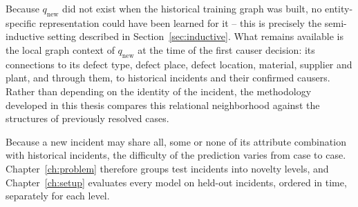 Because $q_{\text{new}}$ did not exist when the historical training graph
was built, no entity-specific representation could have been learned for
it -- this is precisely the semi-inductive setting described in
Section~\ref{sec:inductive}. What remains available is the local graph
context of $q_{\text{new}}$ at the time of the first causer decision: its
connections to its defect type, defect place, defect location, material,
supplier and plant, and through them, to historical incidents and their
confirmed causers. Rather than depending on the identity of the incident,
the methodology developed in this thesis compares this relational
neighborhood against the structures of previously resolved cases.

Because a new incident may share all, some or none of its attribute
combination with historical incidents, the difficulty of the prediction
varies from case to case. Chapter~\ref{ch:problem} therefore groups test
incidents into novelty levels, and Chapter~\ref{ch:setup} evaluates every
model on held-out incidents, ordered in time, separately for each level.
